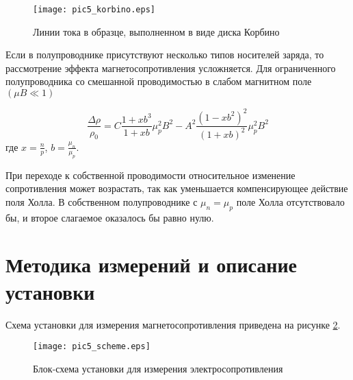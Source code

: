 \begin{figure}[h!]\centering
\texttt{[image: pic5\_korbino.eps]}
\caption{Линии тока в образце, выполненном в виде диска Корбино}
\label{pic5_korbino}
\end{figure}

Если в полупроводнике присутствуют несколько типов носителей заряда, то рассмотрение эффекта магнетосопротивления усложняется. Для ограниченного полупроводника со смешанной проводимостью в слабом магнитном поле $(\mu B \ll 1)$

\begin{equation}
\frac{\Delta \rho}{\rho_{0}} = C \frac{1+ x b^3}{1 + x b} \mu_{p}^{2} B^{2} - A^{2} \frac{(1 - x b^2)^2}{(1 + x b)^2} \mu_{p}^{2} B^{2}
\end{equation}
где $x = \frac{n}{p}$, $b = \frac{\mu_{n}}{\mu_{p}}$.

При переходе к собственной проводимости относительное изменение сопротивления может возрастать, так как уменьшается компенсирующее действие поля Холла. В собственном полупроводнике с $\mu_{n} = \mu_{p}$ поле Холла отсутствовало бы, и второе слагаемое оказалось бы равно нулю.

\section{Методика измерений и описание установки}

Схема установки для измерения магнетосопротивления приведена на рисунке \ref{pic5_scheme}.

\begin{figure}[h!]\centering
\texttt{[image: pic5\_scheme.eps]}
\caption{Блок-схема установки для измерения электросопротивления}
\label{pic5_scheme}
\end{figure}